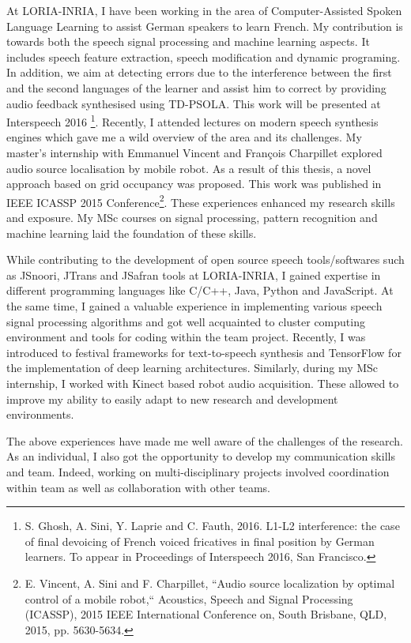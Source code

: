 \documentclass[
	backaddress=off,
	pagenumber=false, %
	parskip=half, %
	fromalign=right, %
	foldmarks=false, %
	addrfield=true %
	]{scrlttr2}
\begin{document}
\begin{letter}
At LORIA-INRIA, I have been working in the area of Computer-Assisted Spoken Language Learning to assist German speakers to learn French. My contribution is towards both the speech signal processing and machine learning aspects. It includes speech feature extraction, speech modification and dynamic programing. In addition, we aim at detecting errors due to the interference between the first and the second languages of the learner and assist him to correct by providing audio feedback synthesised using TD\--PSOLA. This work will be presented at Interspeech 2016 \footnote{S. Ghosh, A. Sini, Y. Laprie and C. Fauth,  2016. L1-L2 interference: the case of final devoicing of French voiced fricatives in final position by German learners. To appear in Proceedings of Interspeech 2016, San Francisco.}. Recently, I attended lectures on modern speech synthesis engines which gave me a wild overview of the area and its challenges. My master's internship with Emmanuel Vincent and François Charpillet explored audio source localisation by mobile robot. As a result of this thesis, a novel approach based on grid occupancy was proposed. This work was published in IEEE ICASSP 2015 Conference\footnote{E. Vincent, A. Sini and F. Charpillet, ``Audio source localization by optimal control of a mobile robot,`` Acoustics, Speech and Signal Processing (ICASSP), 2015 IEEE International Conference on, South Brisbane, QLD, 2015, pp. 5630-5634.}. These experiences enhanced my research skills and exposure. My MSc courses on signal processing, pattern recognition and machine learning laid the foundation of these skills.   

		
While contributing to the development of open source speech tools/softwares such as JSnoori, JTrans and JSafran tools at LORIA-INRIA, I gained expertise in different programming languages like C/C++, Java, Python and JavaScript. At the same time, I gained a valuable experience in implementing  various speech signal processing algorithms and got well acquainted 	to cluster computing environment	and tools for coding within the team project. Recently, I was introduced to festival frameworks for text\--to\--speech synthesis and TensorFlow for the implementation of deep learning architectures. Similarly, during my MSc internship, I worked with Kinect based robot audio acquisition. These allowed to improve my ability to easily adapt to new research and development environments.    

 The above experiences have made me well aware of the challenges of the research. As an individual, I also got the opportunity to develop my communication skills and team. Indeed, working on multi-disciplinary projects involved coordination within  team as well as collaboration with other teams. 


\end{letter}
\end{document}
